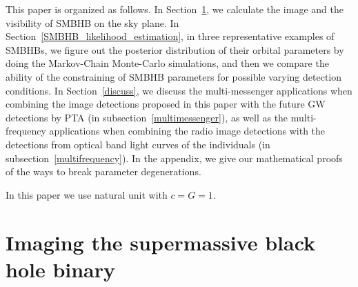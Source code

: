 \documentclass[twocolumn]{aastex62}
\begin{document}

This paper is organized as follows. In Section~\ref{image_SMBHB}, we calculate the image and the visibility of SMBHB on the sky plane. In Section~\ref{SMBHB_likelihood_estimation}, in three representative examples of SMBHBs, we figure out the posterior distribution of their orbital parameters by doing the Markov-Chain Monte-Carlo simulations, and then we compare the ability of the constraining of SMBHB parameters for possible varying detection conditions. In Section~\ref{discuss}, we discuss the multi-messenger applications when combining the image detections proposed in this paper with the future GW detections by PTA (in subsection~\ref{multimessenger}), as well as the multi-frequency applications when combining the radio image detections with the detections from optical band light curves of the individuals (in subsection~\ref{multifrequency}). In the appendix, we give our mathematical proofs of the ways to break parameter degenerations. 

In this paper we use natural unit with $c=G=1$. 

\section{Imaging the supermassive black hole binary}
\label{image_SMBHB}
\end{document}
